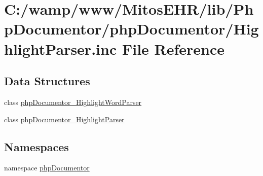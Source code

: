 \hypertarget{_highlight_parser_8inc}{\section{\-C\-:/wamp/www/\-Mitos\-E\-H\-R/lib/\-Php\-Documentor/php\-Documentor/\-Highlight\-Parser.inc \-File \-Reference}
\label{_highlight_parser_8inc}
}
\subsection*{\-Data \-Structures}
\begin{DoxyCompactItemize}
\item 
class \hyperlink{classphp_documentor___highlight_word_parser}{php\-Documentor\-\_\-\-Highlight\-Word\-Parser}
\item 
class \hyperlink{classphp_documentor___highlight_parser}{php\-Documentor\-\_\-\-Highlight\-Parser}
\end{DoxyCompactItemize}
\subsection*{\-Namespaces}
\begin{DoxyCompactItemize}
\item 
namespace \hyperlink{namespacephp_documentor}{php\-Documentor}
\end{DoxyCompactItemize}
